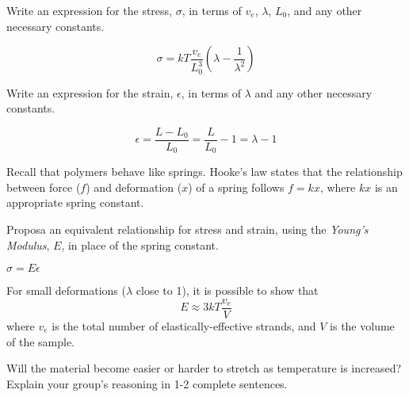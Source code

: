 \begin{activity}
\begin{model}
\end{model}

\begin{ctqs}

	\question Write an expression for the stress, $\sigma$, in terms of $v_e$, $\lambda$, $L_0$, and any other necessary constants.
	
		\begin{solution}[0.8in]
			\begin{equation*}
				\sigma = kT\frac{v_e}{L_0^3}\left(\lambda - \frac{1}{\lambda^2}\right)
			\end{equation*}
		\end{solution}

	\question Write an expression for the strain, $\epsilon$, in terms of $\lambda$ and any other necessary constants.
	
		\begin{solution}[0.8in]
			\begin{equation*}
				\epsilon = \frac{L-L_0}{L_0} = \frac{L}{L_0} -1 = \lambda - 1
			\end{equation*}
		\end{solution}
		
	\question Recall that polymers behave like springs.  Hooke's law states that the relationship between force ($f$) and deformation ($x$) of a spring follows $f=kx$, where $kx$ is an appropriate spring constant.
	
		Proposa an equivalent relationship for stress and strain, using the \emph{Young's Modulus}, $E$, in place of the spring constant.
		
			\begin{solution}[0.5in]
			
				$\sigma = E\epsilon$
				
			\end{solution}
	
\end{ctqs}

\begin{infobox}
	For small deformations ($\lambda$ close to 1), it is possible to show that
	\begin{equation*}
		E \approx 3kT\frac{v_e}{V}
	\end{equation*}
	where $v_e$ is the total number of elastically-effective strands, and $V$ is the volume of the sample.
\end{infobox}

\begin{ctqs}
	\question Will the material become easier or harder to stretch as temperature is increased?  Explain your group's reasoning in 1-2 complete sentences.
	

\end{ctqs}
\end{activity}
